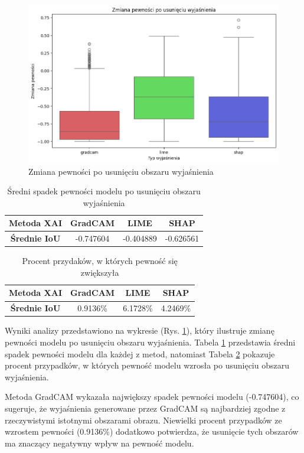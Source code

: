 \begin{figure}
	\centering\includegraphics[width=.6\textwidth]{img/base_confidence_no_exp}
	\caption{Zmiana pewności po usunięciu obszaru wyjaśnienia}  \label{rys:base_confidence_no_exp}
\end{figure}

\begin{table}
	\centering
	\begin{tabular}{|c|c|c|c|}
		\hline
		\textbf{Metoda XAI}  & GradCAM   & LIME      & SHAP      \\
		\hline
		\textbf{Średnie IoU} & -0.747604 & -0.404889 & -0.626561 \\
		\hline
	\end{tabular}
	\caption{Średni spadek pewności modelu po usunięciu obszaru wyjaśnienia}
	\label{tab:base_confidence_no_exp}
\end{table}

\begin{table}
	\centering
	\begin{tabular}{|c|c|c|c|}
		\hline
		\textbf{Metoda XAI}  & GradCAM  & LIME     & SHAP     \\
		\hline
		\textbf{Średnie IoU} & 0.9136\% & 6.1728\% & 4.2469\% \\
		\hline
	\end{tabular}
	\caption{Procent przydaków, w których pewność się zwiększyła}
	\label{tab:base_confidence_no_exp_percent}
\end{table}

Wyniki analizy przedstawiono na wykresie (Rys. \ref{rys:base_confidence_no_exp}), który ilustruje zmianę pewności modelu po usunięciu obszaru wyjaśnienia.
Tabela \ref{tab:base_confidence_no_exp} przedstawia średni spadek pewności modelu dla każdej z metod, natomiast Tabela \ref{tab:base_confidence_no_exp_percent} pokazuje procent przypadków, w których pewność modelu wzrosła po usunięciu obszaru wyjaśnienia.

Metoda GradCAM wykazała największy spadek pewności modelu (-0.747604), co sugeruje, że wyjaśnienia generowane przez GradCAM są najbardziej zgodne z rzeczywistymi istotnymi obszarami obrazu.
Niewielki procent przypadków ze wzrostem pewności (0.9136\%) dodatkowo potwierdza, że usunięcie tych obszarów ma znaczący negatywny wpływ na pewność modelu.

